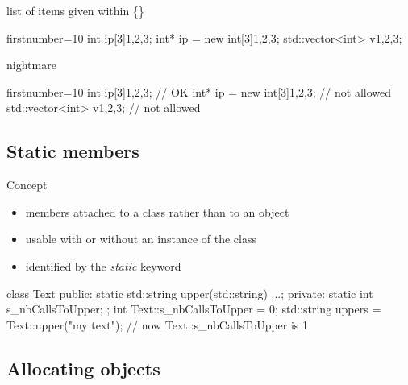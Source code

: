 \begin{frame}[fragile]
  \begin{exampleblock}{list of items given within \{\}}
    \begin{cppcode*}{firstnumber=10}
     int ip[3]{1,2,3};
     int* ip = new int[3]{1,2,3};
     std::vector<int> v{1,2,3};
    \end{cppcode*}
  \end{exampleblock}
  \pause
  \begin{block}{ nightmare}
    \begin{cppcode*}{firstnumber=10}
     int ip[3]{1,2,3};            // OK
     int* ip = new int[3]{1,2,3}; // not allowed
     std::vector<int> v{1,2,3};   // not allowed
    \end{cppcode*}
  \end{block}
\end{frame}

\subsection[static]{Static members}

\begin{frame}[fragile]
  \begin{block}{Concept}
    \begin{itemize}
    \item members attached to a class rather than to an object
    \item usable with or without an instance of the class
    \item identified by the {\it static} keyword
    \end{itemize}
  \end{block}
  \begin{cppcode}
    class Text {
    public:
      static std::string upper(std::string) {...};
    private:
      static int s_nbCallsToUpper;
    };
    int Text::s_nbCallsToUpper = 0;
    std::string uppers = Text::upper("my text");
    // now Text::s_nbCallsToUpper is 1
  \end{cppcode}
\end{frame}

\subsection[new]{Allocating objects}

